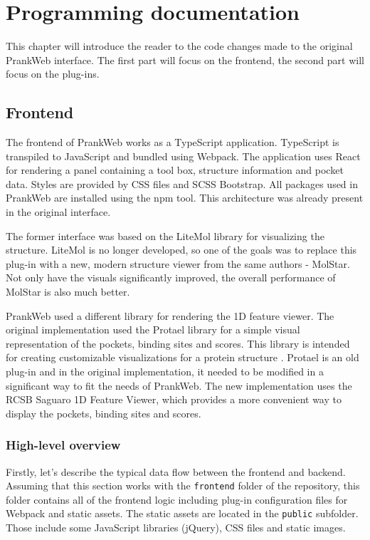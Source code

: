 \chapter{Programming documentation}
\label{chap:prog_docs}

This chapter will introduce the reader to the code changes made to the original PrankWeb interface. The first part will focus on the frontend, the second part will focus on the plug-ins.

\section{Frontend}
\label{sec:frontend}

The frontend of PrankWeb works as a TypeScript application. TypeScript is transpiled to JavaScript and bundled using Webpack. The application uses React for rendering a panel containing a tool box, structure information and pocket data. Styles are provided by CSS files and SCSS Bootstrap. All packages used in PrankWeb are installed using the npm tool. This architecture was already present in the original interface.

The former interface was based on the LiteMol library for visualizing the structure. LiteMol is no longer developed, so one of the goals was to replace this plug-in with a new, modern structure viewer from the same authors - MolStar. Not only have the visuals significantly improved, the overall performance of MolStar is also much better. \cite{10.1093/nar/gkab314}

PrankWeb used a different library for rendering the 1D feature viewer. The original implementation used the Protael library for a simple visual representation of the pockets, binding sites and scores. This library is intended for creating customizable visualizations for a protein structure \cite{10.1093/bioinformatics/btv605}. Protael is an old plug-in and in the original implementation, it needed to be modified in a significant way to fit the needs of PrankWeb. The new implementation uses the RCSB Saguaro 1D Feature Viewer, which provides a more convenient way to display the pockets, binding sites and scores. \cite{10.1093/bioinformatics/btaa1012}

\subsection{High-level overview}
\label{subsec:frontend-overview}

Firstly, let's describe the typical data flow between the frontend and backend. Assuming that this section works with the \texttt{frontend} folder of the repository, this folder contains all of the frontend logic including plug-in configuration files for Webpack and static assets. The static assets are located in the \texttt{public} subfolder. Those include some JavaScript libraries (jQuery), CSS files and static images. 


